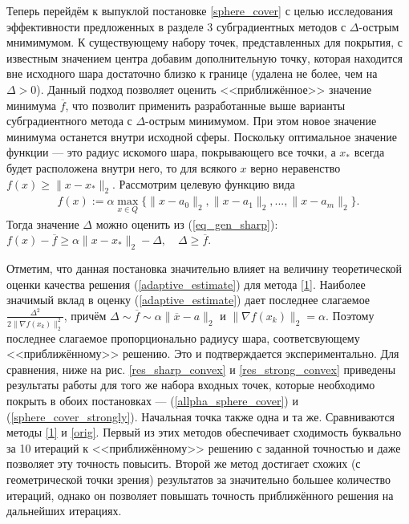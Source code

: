 Теперь перейдём к выпуклой постановке \eqref{sphere_cover} с целью исследования эффективности предложенных в разделе 3 субградиентных методов с $\Delta$-острым мнимимумом. К существующему набору точек, представленных для покрытия, с известным значением центра добавим дополнительную точку, которая находится вне исходного шара достаточно близко к границе (удалена не более, чем на $\Delta > 0$). Данный подход позволяет оценить <<приближённое>> значение минимума $\overline{f}$, что позволит применить разработанные выше варианты субградиентного метода с $\Delta$-острым минимумом. При этом новое значение минимума останется внутри исходной сферы. Поскольку оптимальное значение функции --- это радиус искомого шара, покрывающего все точки, а $x_*$ всегда будет расположена внутри него, то для всякого $x$ верно неравенство $ f(x) \geq \| x - x_*\|_2$. Рассмотрим целевую функцию вида
\begin{gather}\label{allpha_sphere_cover}
    f(x) := \alpha \max_{x\in Q}\{\|x - a_0\|_2, \|x - a_1\|_2, ..., \|x - a_m\|_2\}.
\end{gather}
Тогда значение $\Delta$ можно оценить  из (\ref{eq_gen_sharp}): 
    $f(x) - \overline{f} \geq \alpha\|x- x_*\|_2 - \Delta, \quad \Delta \geq \overline{f}$.

Отметим, что данная постановка значительно влияет на величину теоретической оценки качества решения (\ref{adaptive_estimate}) для метода \eqref{1}.
Наиболее значимый вклад в оценку (\ref{adaptive_estimate}) дает последнее слагаемое $\frac{\Delta^2}{2\|\nabla f(x_k)\|^2_2}$, причём 
$     \Delta \sim \overline{f} \sim \alpha \|\overline{x}-a\|_2 $ и 
$     \|\nabla f(x_k)\|_2 = \alpha $. Поэтому последнее слагаемое пропорционально радиусу шара, соответсвующему <<приближённому>> решению. Это и подтверждается экспериментально. Для сравнения, ниже на рис. \ref{res_sharp_convex} и \ref{res_strong_convex} приведены результаты работы для того же набора входных точек, которые необходимо покрыть в обоих постановках --- (\ref{allpha_sphere_cover}) и (\ref{sphere_cover_strongly}). Начальная точка также одна и та же. Сравниваются методы \eqref{1} и \eqref{orig}. Первый из этих методов обеспечивает сходимость буквально за 10 итераций к <<приближённому>> решению с заданной точностью и даже позволяет эту точность повысить. Второй же метод достигает схожих (с геометрической точки зрения) результатов за значительно большее количество итераций, однако он позволяет повышать точность приближённого решения на дальнейших итерациях.

